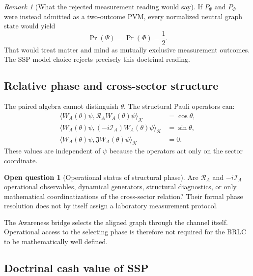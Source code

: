\documentclass[11pt,reqno]{scrartcl}
\newcommand{\scrK}{\mathscr K}
\newcommand{\fundJ}{\mathfrak J}
\newcommand{\PP}{P_{\Psi}}
\newcommand{\PF}{P_{\Phi}}
\newcommand{\RA}{\mathcal R_{A}}
\newcommand{\IA}{\mathcal I_{A}}
\newcommand{\inner}[2]{\langle #1,#2\rangle}
\newcommand{\WAtheta}{W_{A}(\theta)}
\theoremstyle{plain}
\theoremstyle{definition}
\newtheorem{openquestion}[openquestion]{Open question}
\theoremstyle{remark}
\newtheorem{remark}[remark]{Remark}
\begin{document}
\begin{remark}[What the rejected measurement reading would say]
\label{rem:rejected-sector-measurement-reading}
If \(\PP\) and \(\PF\) were instead admitted as a two-outcome PVM, every
normalized neutral graph state would yield
\begin{equation}
  \Pr(\Psi)=\Pr(\Phi)=\frac12.
\end{equation}
That would treat matter and mind as mutually exclusive measurement outcomes.
The SSP model choice rejects precisely this doctrinal reading.
\end{remark}

\subsection{Relative phase and cross-sector structure}

The paired algebra cannot distinguish \(\theta\).  The structural Pauli
operators can:
\begin{align}
  \inner{\WAtheta\psi}{\RA\WAtheta\psi}_{\scrK}
  &=\cos\theta,
  \label{eq:RA-phase-expectation-active}\\
  \inner{\WAtheta\psi}{(-i\IA)\WAtheta\psi}_{\scrK}
  &=\sin\theta,
  \label{eq:QA-phase-expectation-active}\\
  \inner{\WAtheta\psi}{\fundJ\WAtheta\psi}_{\scrK}
  &=0.
  \label{eq:J-neutral-expectation-active}
\end{align}
These values are independent of \(\psi\) because the operators act only on
the sector coordinate.

\begin{openquestion}[Operational status of structural phase]
\label{q:operational-structural-phase}
Are \(\RA\) and \(-i\IA\) operational observables, dynamical generators,
structural diagnostics, or only mathematical coordinatizations of the
cross-sector relation?  Their formal phase resolution does not by itself
assign a laboratory measurement protocol.
\end{openquestion}

The Awareness bridge selects the aligned graph through the channel itself.
Operational access to the selecting phase is therefore not required for the
BRLC to be mathematically well defined.

\subsection{Doctrinal cash value of SSP}
\end{document}
